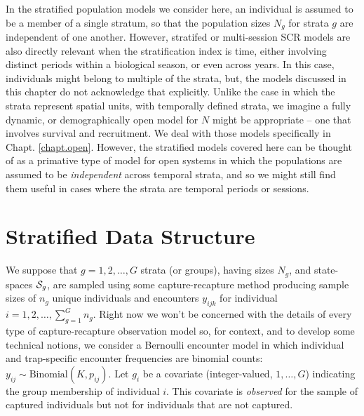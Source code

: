 In the stratified population models we consider here, an individual is
assumed to be a member of a single stratum, so that the population
sizes $N_{g}$ for strata $g$ are independent of one another. However,
stratifed or multi-session SCR models are also directly relevant when
the stratification index is time, either involving distinct periods within
a biological season, or even across years. In this case, individuals
might belong to multiple of the strata, but, the models discussed in
this chapter do not acknowledge that explicitly.
Unlike the case in which the strata represent spatial units, with
temporally defined strata, we imagine a fully dynamic, or
demographically open model for $N$ might be appropriate -- one that
involves survival and recruitment. We deal with those models
specifically in Chapt. \ref{chapt.open}.  However, the stratified
models covered here can be thought of as a primative type of model for
open systems in which the populations are assumed to be {\it
  independent} across temporal strata, and so we might still find them
useful in cases where the strata are temporal periods or sessions. 

\section{Stratified Data Structure}


We suppose that $g=1,2,\ldots,G$ strata (or groups), having sizes $N_{g}$,
and state-spaces ${\cal S}_{g}$, are sampled using some capture-recapture
method producing sample sizes of $n_{g}$ unique individuals and
encounters $y_{ijk}$ for individual $i=1,2,\ldots, \sum_{g=1}^{G}
n_{g}$.  Right now we won't be concerned with the details of every
type of capture-recapture observation model so, for context, and to
develop some technical notions, we
consider a Bernoulli encounter model in which individual and trap-specific
encounter frequencies are binomial counts: $y_{ij} \sim
\mbox{Binomial}(K,p_{ij})$.  Let $g_{i}$ be a covariate
(integer-valued, $1, \ldots, G$) indicating the group membership
of individual $i$. This covariate is {\it observed} for the sample of
captured individuals but not for individuals that are not captured.

